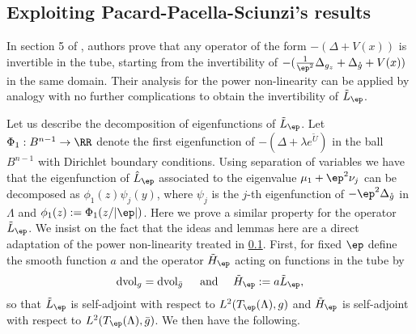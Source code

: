 
\subsection{Exploiting Pacard-Pacella-Sciunzi's results}
\label{sec:exploiting-pacard}

In section 5 of \cite{Pacard2014}, authors prove that any operator of the form
$-(\Delta+V(x))$ is invertible in the tube, starting from the invertibility of
$-(\frac{1}{\ep^2}\Delta_{g_z}+\Delta_{\mathring g}+V(x))$ in the same domain.
Their analysis for the power non-linearity can be applied by analogy with no
further complications to obtain the invertibility of $\tilde L_\ep$.

Let us describe the decomposition of eigenfunctions of $\tilde L_\ep$. Let
$\Phi_1:B^{n-1}\to \RR$ denote the first eigenfunction of $-(\Delta+\lambda
e^{\tilde U})$ in the ball $B^{n-1}$ with Dirichlet boundary conditions. Using
separation of variables we have that the eigenfunction of $\hat L_\ep$
associated to the eigenvalue $\mu_1+\ep^2\nu_j$ can be decomposed as
$\phi_1(z)\psi_j(y)$, where $\psi_j$ is the $j$-th eigenfunction of
$-\ep^2\Delta_{\mathring g}$ in $\Lambda$ and $\phi_1(z):=\Phi_1(z/|\ep|)$. Here
we prove a similar property for the operator $\tilde L_\ep$. We insist on the
fact that the ideas and lemmas here are a direct adaptation of the power
non-linearity treated in \ref{sec:exploiting-pacard}. First, for fixed $\ep$
define the smooth function $a$ and the operator $\tilde H_\ep$ acting on
functions in the tube by
\begin{equation}
    \operatorname{dvol}_g = \operatorname{dvol}_{\bar g}\quad \mbox{ and }
    \quad \tilde H_\ep:= a\tilde L_\ep,
\end{equation}
so that $\tilde L_\ep$ is self-adjoint with respect to $L^2(T_\ep(\Lambda),g)$
and $\tilde H_\ep$ is self-adjoint with respect to $L^2(T_\ep(\Lambda),\bar
g)$. We then have the following.

